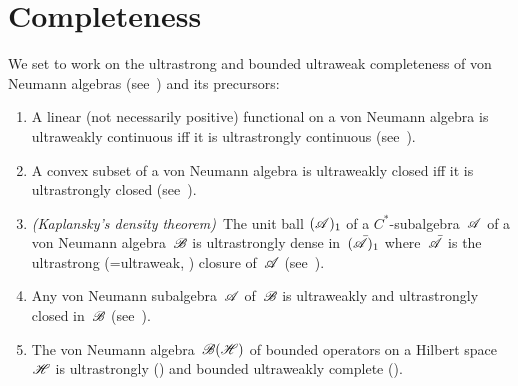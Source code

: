 \documentclass[a]{subfiles}
\begin{document}
\section{Completeness}
\begin{parsec}%
\begin{point}%
We set to work on the ultrastrong and bounded ultraweak completeness
of von Neumann algebras (see~) and its precursors:
\begin{enumerate}
\item
A linear (not necessarily positive)
functional on a von Neumann algebra
is ultraweakly continuous iff it is ultrastrongly continuous
(see~).
\item
A convex subset of a von Neumann algebra
is ultraweakly closed iff it is ultrastrongly closed
(see~).
\item
\emph{(Kaplansky's density theorem)}\ 
The unit ball $(\mathscr{A})_1$
of a $C^*$-subalgebra~$\mathscr{A}$
of a von Neumann algebra~$\mathscr{B}$
is ultrastrongly dense in~$(\bar{\mathscr{A}})_1$
where~$\bar{\mathscr{A}}$ is the ultrastrong (=ultraweak,
) closure of~$\mathscr{A}$
(see~).
\item
Any von Neumann subalgebra~$\mathscr{A}$
of~$\mathscr{B}$ is ultraweakly and ultrastrongly
closed in~$\mathscr{B}$
(see~).
\item
The von Neumann algebra~$\mathscr{B}(\mathscr{H})$ 
of bounded operators on a Hilbert space~$\mathscr{H}$
is ultrastrongly 
()
and bounded ultraweakly complete
().
\end{enumerate}

\end{point}
\end{parsec}
\end{document}
